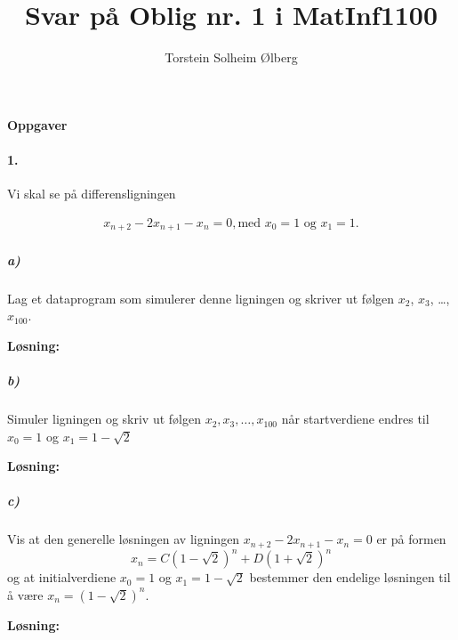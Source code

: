 \documentclass[11pt,norsk]{article}
\author{Torstein Solheim Ølberg}
\title{Svar på Oblig nr. 1 i MatInf1100}
\begin{document}
\maketitle
	\begin{center}
\Large \textbf{Oppgaver}
	\end{center}
		\paragraph{1.}
			\begin{flushleft}
Vi skal se på differensligningen
			\end{flushleft}
				\begin{align}
x_{n+2} - 2x_{n+1} - x_{n} = 0, \text{med $x_0 = 1$ og $x_1 = 1$.}
				\end{align}
			\subparagraph{a)}
				\begin{flushleft}
Lag et dataprogram som simulerer denne ligningen og skriver ut følgen $x_2$, $x_3$, \dots, $x_{100}$.
				\end{flushleft}
				\begin{flushleft}
\textbf{Løsning:}
				\end{flushleft}

			\subparagraph{b)}
				\begin{flushleft}
Simuler ligningen og skriv ut følgen $x_2, x_3, \dots, x_{100}$ når startverdiene endres til $x_0 = 1$ og $x_1 = 1 - \sqrt{2}$
				\end{flushleft}
				\begin{flushleft}
\textbf{Løsning:}
				\end{flushleft}

			\subparagraph{c)}
				\begin{flushleft}
Vis at den generelle løsningen av ligningen $x_{n+2} - 2 x_{n+1} - x_{n} = 0$ er på formen
$$
x_n = C(1-\sqrt 2)^n + D(1+\sqrt 2)^n
$$
og at initialverdiene $x_0=1$ og $x_1 = 1-\sqrt 2$ bestemmer den endelige løsningen til å være $x_n = (1-\sqrt 2)^n$.
				\end{flushleft}
				\begin{flushleft}
\textbf{Løsning:}
				\end{flushleft}
\end{document}
